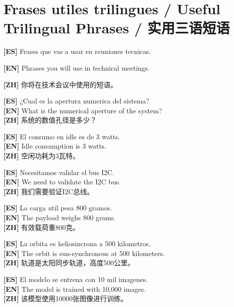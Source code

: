 \documentclass[11pt,a4paper]{report}
\begin{document}
\chapter{Frases utiles trilingues / Useful Trilingual Phrases / 实用三语短语}

\noindent\textbf{[ES]} Frases que vas a usar en reuniones tecnicas.

\noindent\textbf{[EN]} Phrases you will use in technical meetings.

\noindent\textbf{[ZH]} 你将在技术会议中使用的短语。

\vspace{1em}

\noindent\textbf{[ES]} ¿Cual es la apertura numerica del sistema?\\
\textbf{[EN]} What is the numerical aperture of the system?\\
\textbf{[ZH]} 系统的数值孔径是多少？

\vspace{0.5em}
\noindent\textbf{[ES]} El consumo en idle es de 3 watts.\\
\textbf{[EN]} Idle consumption is 3 watts.\\
\textbf{[ZH]} 空闲功耗为3瓦特。

\vspace{0.5em}
\noindent\textbf{[ES]} Necesitamos validar el bus I2C.\\
\textbf{[EN]} We need to validate the I2C bus.\\
\textbf{[ZH]} 我们需要验证I2C总线。

\vspace{0.5em}
\noindent\textbf{[ES]} La carga util pesa 800 gramos.\\
\textbf{[EN]} The payload weighs 800 grams.\\
\textbf{[ZH]} 有效载荷重800克。

\vspace{0.5em}
\noindent\textbf{[ES]} La orbita es heliosincrona a 500 kilometros.\\
\textbf{[EN]} The orbit is sun-synchronous at 500 kilometers.\\
\textbf{[ZH]} 轨道是太阳同步轨道，高度500公里。

\vspace{0.5em}
\noindent\textbf{[ES]} El modelo se entrena con 10 mil imagenes.\\
\textbf{[EN]} The model is trained with 10,000 images.\\
\textbf{[ZH]} 该模型使用10000张图像进行训练。
\end{document}
